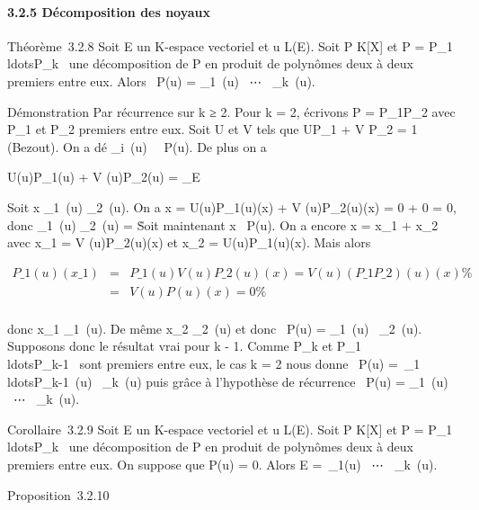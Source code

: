 \documentclass[]{article}
\begin{document}
\paragraph{3.2.5 Décomposition des noyaux}

Théorème~3.2.8 Soit E un K-espace vectoriel et u \in L(E). Soit P \in
K{[}X{]} et P =
P\_1\\ldotsP\_k~
une décomposition de P en produit de polynômes deux à deux premiers
entre eux. Alors
\mathrmKer~P(u)
= \mathrmKerP\_1~(u)
\oplus~⋯
\oplus~\mathrmKerP\_k~(u).

Démonstration Par récurrence sur k ≥ 2. Pour k = 2, écrivons P =
P\_1P\_2 avec P\_1 et P\_2 premiers
entre eux. Soit U et V tels que UP\_1 + V P\_2 = 1
(Bezout). On a dé
\mathrmKerP\_i~(u)
\subset~\mathrmKer~P(u). De plus on
a

U(u)P\_1(u) + V (u)P\_2(u) =
\mathrmId\_E

Soit x
\in\mathrmKerP\_1~(u)
\bigcap\mathrmKerP\_2~(u).
On a x = U(u)P\_1(u)(x) + V (u)P\_2(u)(x) = 0 + 0 = 0,
donc
\mathrmKerP\_1~(u)
\bigcap\mathrmKerP\_2~(u)
= \0\. Soit maintenant x
\in\mathrmKer~P(u). On a
encore x = x\_1 + x\_2 avec x\_1 = V
(u)P\_2(u)(x) et x\_2 = U(u)P\_1(u)(x). Mais
alors

\begin{align*} P\_1(u)(x\_1)& =&
P\_1(u)V (u)P\_2(u)(x) = V
(u)(P\_1P\_2)(u)(x)\%& \\
& =& V (u)P(u)(x) = 0 \%& \\
\end{align*}

donc x\_1
\in\mathrmKerP\_1~(u).
De même x\_2
\in\mathrmKerP\_2~(u)
et donc \mathrmKer~P(u)
= \mathrmKerP\_1~(u)
\oplus~\mathrmKerP\_2~(u).
Supposons donc le résultat vrai pour k - 1. Comme P\_k et
P\_1\\ldotsP\_k-1~
sont premiers entre eux, le cas k = 2 nous donne
\mathrmKer~P(u)
=\
\mathrmKerP\_1\\ldotsP\_k-1~(u)
\oplus~\mathrmKerP\_k~(u)
puis grâce à l'hypothèse de récurrence
\mathrmKer~P(u)
= \mathrmKerP\_1~(u)
\oplus~⋯
\oplus~\mathrmKerP\_k~(u).

Corollaire~3.2.9 Soit E un K-espace vectoriel et u \in L(E). Soit P \in
K{[}X{]} et P =
P\_1\\ldotsP\_k~
une décomposition de P en produit de polynômes deux à deux premiers
entre eux. On suppose que P(u) = 0. Alors E =\
\mathrmKerP\_1(u)
\oplus~⋯
\oplus~\mathrmKerP\_k~(u).

Proposition~3.2.10
\end{document}
